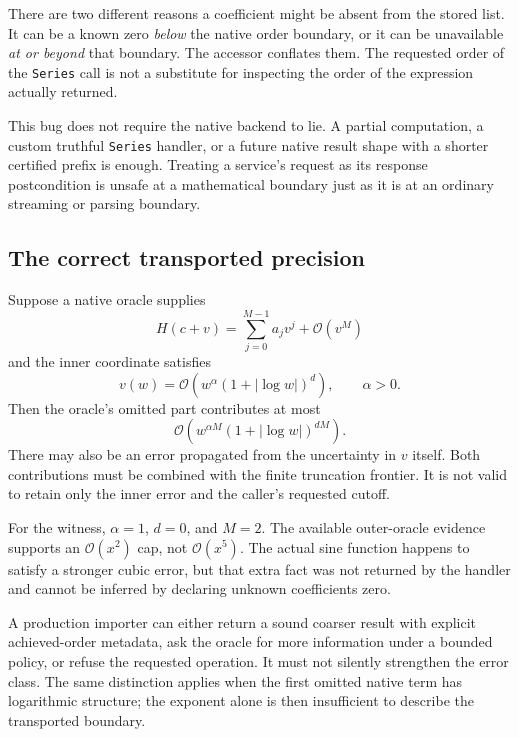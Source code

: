\documentclass[11pt,letterpaper]{article}
\newcommand{\code}[1]{\nolinkurl{#1}}
\newcommand{\OO}{\mathcal{O}}
\begin{document}
There are two different reasons a coefficient might be absent from the stored
list. It can be a known zero \emph{below} the native order boundary, or it can
be unavailable \emph{at or beyond} that boundary. The accessor conflates them.
The requested order of the \code{Series} call is not a substitute for inspecting
the order of the expression actually returned.

This bug does not require the native backend to lie. A partial computation,
a custom truthful \code{Series} handler, or a future native result shape with a
shorter certified prefix is enough. Treating a service's request as its response
postcondition is unsafe at a mathematical boundary just as it is at an ordinary
streaming or parsing boundary.

\subsection{The correct transported precision}
Suppose a native oracle supplies
\begin{equation}
 H(c+v)=\sum_{j=0}^{M-1}a_jv^j+\OO(v^M)
\end{equation}
and the inner coordinate satisfies
\begin{equation}
 v(w)=\OO\!\left(w^\alpha(1+|\log w|)^d\right),\qquad\alpha>0.
\end{equation}
Then the oracle's omitted part contributes at most
\begin{equation}\label{eq:oracletransport}
 \OO\!\left(w^{\alpha M}(1+|\log w|)^{dM}\right).
\end{equation}
There may also be an error propagated from the uncertainty in $v$ itself.
Both contributions must be combined with the finite truncation frontier. It
is not valid to retain only the inner error and the caller's requested cutoff.

For the witness, $\alpha=1$, $d=0$, and $M=2$. The available outer-oracle evidence
supports an $\OO(x^2)$ cap, not $\OO(x^5)$. The actual sine function happens to
satisfy a stronger cubic error, but that extra fact was not returned by the
handler and cannot be inferred by declaring unknown coefficients zero.

A production importer can either return a sound coarser result with explicit
achieved-order metadata, ask the oracle for more information under a bounded
policy, or refuse the requested operation. It must not silently strengthen the
error class. The same distinction applies when the first omitted native term
has logarithmic structure; the exponent alone is then insufficient to describe
the transported boundary.
\end{document}
